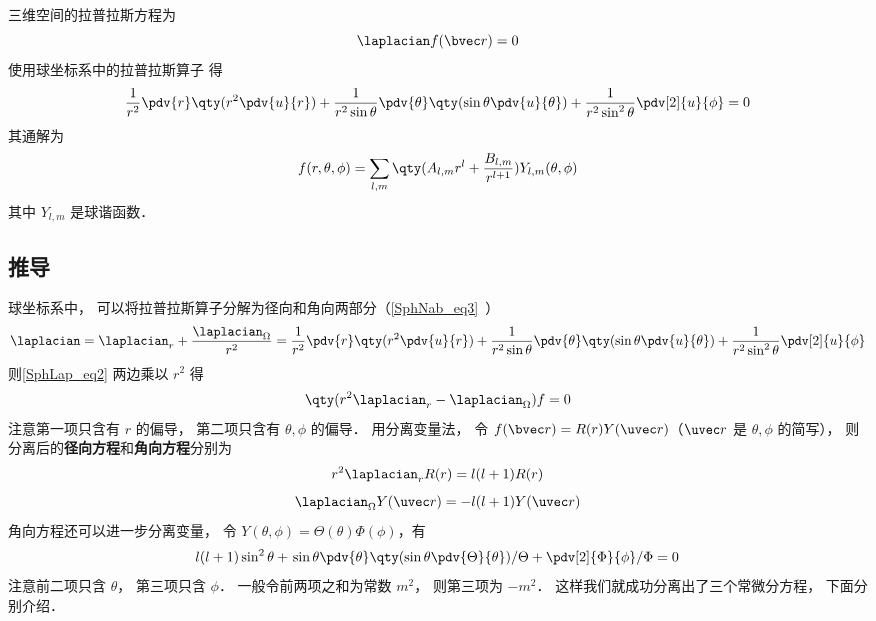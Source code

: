 

三维空间的拉普拉斯方程为
\begin{equation}\label{SphLap_eq2}
\laplacian f(\bvec r) = 0
\end{equation}
使用球坐标系中的拉普拉斯算子 得
\begin{equation}
\frac{1}{r^2} \pdv{r} \qty(r^2 \pdv{u}{r}) + \frac{1}{r^2\sin\theta}\pdv{\theta} \qty(\sin \theta \pdv{u}{\theta}) + \frac{1}{r^2\sin^2 \theta} \pdv[2]{u}{\phi} = 0
\end{equation}
其通解为
\begin{equation}\label{SphLap_eq7}
f(r, \theta, \phi) = \sum_{l,m} \qty(A_{l,m} r^l + \frac{B_{l,m}}{r^{l+1}}) Y_{l,m} (\theta, \phi)
\end{equation}
其中 $Y_{l,m}$ 是球谐函数．

\subsection{推导}
球坐标系中， 可以将拉普拉斯算子分解为径向和角向两部分（\autoref{SphNab_eq3}~）
\begin{equation}\label{SphLap_eq5}
\laplacian = \laplacian_r + \frac{\laplacian_{\Omega}}{r^2} = \frac{1}{r^2} \pdv{r} \qty(r^2 \pdv{u}{r}) + \frac{1}{r^2\sin\theta}\pdv{\theta} \qty(\sin \theta \pdv{u}{\theta}) + \frac{1}{r^2\sin^2 \theta} \pdv[2]{u}{\phi}
\end{equation}
则\autoref{SphLap_eq2} 两边乘以 $r^2$ 得
\begin{equation}
\qty(r^2\laplacian_r - \laplacian_\Omega) f = 0
\end{equation}
注意第一项只含有 $r$ 的偏导， 第二项只含有 $\theta,\phi$ 的偏导． 用分离变量法， 令 $f(\bvec r) = R(r) Y(\uvec r)$（$\uvec r$ 是 $\theta, \phi$ 的简写）， 则分离后的\textbf{径向方程}和\textbf{角向方程}分别为
\begin{equation}\label{SphLap_eq4}
r^2\laplacian_r R(r) = l(l+1)R(r)
\end{equation}
\begin{equation}\label{SphLap_eq1}
\laplacian_{\Omega} Y(\uvec r) = -l(l+1) Y(\uvec r)
\end{equation}
角向方程还可以进一步分离变量， 令 $Y(\theta,\phi) = \Theta(\theta)\Phi(\phi)$，有
\begin{equation}\label{SphLap_eq3}
l(l+1)\sin^2 \theta + \left. \sin\theta\pdv{\theta} \qty(\sin \theta \pdv{\Theta}{\theta}) \middle/ \Theta + \pdv[2]{\Phi}{\phi} \middle/ \Phi = 0 \right.
\end{equation}
注意前二项只含 $\theta$， 第三项只含 $\phi$． 一般令前两项之和为常数 $m^2$， 则第三项为 $-m^2$． 这样我们就成功分离出了三个常微分方程， 下面分别介绍．


